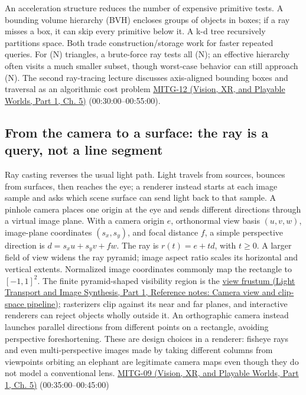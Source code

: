 An acceleration structure reduces the number of expensive primitive tests. A bounding volume hierarchy (BVH) encloses groups of objects in boxes; if a ray misses a box, it can skip every primitive below it. A k-d tree recursively partitions space. Both trade construction/storage work for faster repeated queries. For (N) triangles, a brute-force ray tests all (N); an effective hierarchy often visits a much smaller subset, though worst-case behavior can still approach (N). The second ray-tracing lecture discusses axis-aligned bounding boxes and traversal as an algorithmic cost problem \href{../07-Vision-XR-and-Playable-Worlds-P01/main.pdf\#nameddest=04-visual-computing-ii-ch036-mitg-12---ray-tracing-ii}{MITG-12 (Vision, XR, and Playable Worlds, Part 1, Ch. 5)} (00:30:00--00:55:00).

\subsection{From the camera to a surface: the ray is a query, not a line segment}\label{04-visual-computing-ii-ch028-from-the-camera-to-a-surface-the-ray-is-a-query-not-a-line-segment}

\hypertarget{04-visual-computing-ii-ch028-from-the-camera-to-a-surface-the-ray-is-a-query-not-a-line-segment}{}

Ray casting reverses the usual light path. Light travels from sources, bounces from surfaces, then reaches the eye; a renderer instead starts at each image sample and asks which scene surface can send light back to that sample. A pinhole camera places one origin at the eye and sends different directions through a virtual image plane. With a camera origin \(e\), orthonormal view basis \((u,v,w)\), image-plane coordinates \((s_x,s_y)\), and focal distance \(f\), a simple perspective direction is \(d=s_xu+s_yv+fw\). The ray is \(r(t)=e+td\), with \(t\geq 0\). A larger field of view widens the ray pyramid; image aspect ratio scales its horizontal and vertical extents. Normalized image coordinates commonly map the rectangle to \([-1,1]^2\). The finite pyramid-shaped visibility region is the \href{../04-Light-Transport-and-Image-Synthesis-P01/main.pdf\#nameddest=appendix-1c07d64f5e70}{view frustum (Light Transport and Image Synthesis, Part 1, Reference notes: Camera view and clip-space pipeline)}; rasterizers clip against its near and far planes, and interactive renderers can reject objects wholly outside it. An orthographic camera instead launches parallel directions from different points on a rectangle, avoiding perspective foreshortening. These are design choices in a renderer: fisheye rays and even multi-perspective images made by taking different columns from viewpoints orbiting an elephant are legitimate camera maps even though they do not model a conventional lens. \href{../07-Vision-XR-and-Playable-Worlds-P01/main.pdf\#nameddest=04-visual-computing-ii-ch036-mitg-09---ray-casting}{MITG-09 (Vision, XR, and Playable Worlds, Part 1, Ch. 5)} (00:35:00--00:45:00)

